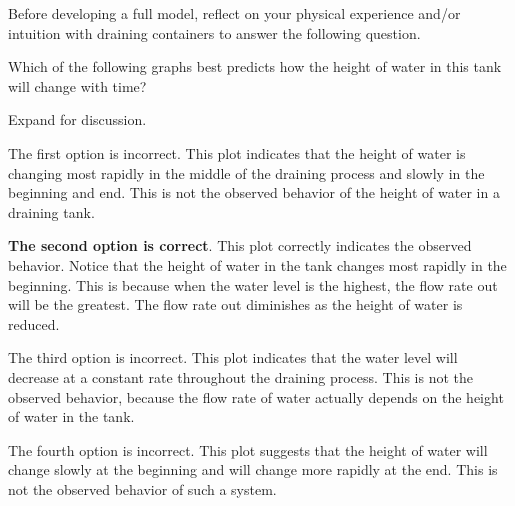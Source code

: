 \documentclass{ximera}
\begin{document}
Before developing a full model, reflect on your physical experience and/or intuition with draining containers to answer the following question.  

\begin{question}\label{quest:guessGraphTank}
Which of the following graphs best predicts how the height of water in this tank will change with time?
 
%
%
%
%



Expand for discussion.
 
\begin{expandable}
    The first option is incorrect.  This plot indicates that the height of water is changing most rapidly in the middle of the draining process and slowly in the beginning and end.  This is not the observed behavior of the height of water in a draining tank.
    
     \textbf{The second option is correct}.  This plot correctly indicates the observed behavior.  Notice that the height of water in the tank changes most rapidly in the beginning.  This is because when the water level is the highest, the flow rate out will be the greatest.  The flow rate out diminishes as the height of water is reduced.
     
     The third option is incorrect.  This plot indicates that the water level will decrease at a constant rate throughout the draining process.  This is not the observed behavior, because the flow rate of water actually depends on the height of water in the tank.
     
     The fourth option is incorrect.  This plot suggests that the height of water will change slowly at the beginning and will change more rapidly at the end.  This is not the observed behavior of such a system.  
     
 \end{expandable}
 
 \end{question}
 
\end{document}
